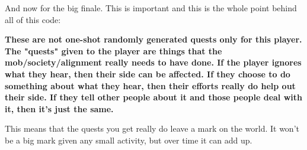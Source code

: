 And now for the big finale. This is important and this is the whole point
behind all of this code:

\newpage

{\bf{\large{These are not one-shot randomly generated quests only for this
player. The "quests" given to the player are things that the
mob/society/alignment really needs to have done. If the player ignores what
they hear, then their side can be affected.  If they choose to do something
about what they hear, then their efforts really do help out their side. If
they tell other people about it and those people deal with it, then it's just
the same.}}}

This means that the quests you get really do leave a mark on the world. It
won't be a big mark given any small activity, but over time it can add up.
